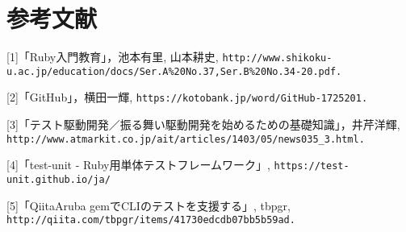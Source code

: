 \section{参考文献}
[1]「Ruby入門教育」，池本有里, 山本耕史, \verb|http://www.shikoku-u.ac.jp/education/docs/Ser.A%20No.37,Ser.B%20No.34-20.pdf.|

[2]「GitHub」，横田一輝, \verb|https://kotobank.jp/word/GitHub-1725201.|

[3]「テスト駆動開発／振る舞い駆動開発を始めるための基礎知識」，井芹洋輝, \verb|http://www.atmarkit.co.jp/ait/articles/1403/05/news035_3.html.|

[4]「test-unit - Ruby用単体テストフレームワーク」, \verb|https://test-unit.github.io/ja/|

[5]「QiitaAruba gemでCLIのテストを支援する」, tbpgr, \verb|http://qiita.com/tbpgr/items/41730edcdb07bb5b59ad.|

